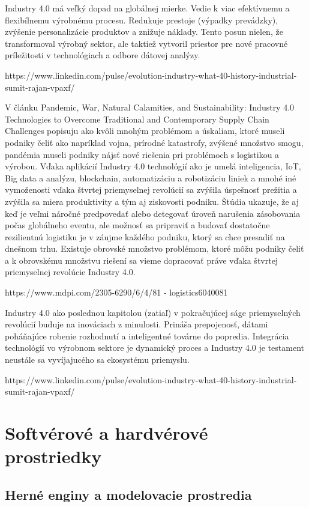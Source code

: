 Industry 4.0 má veľký dopad na globálnej mierke. Vedie k viac efektívnemu a flexibílnemu výrobnému procesu. Redukuje prestoje (výpadky prevádzky), zvýšenie personalizácie produktov a znižuje náklady. Tento posun nielen, že transformoval výrobný sektor, ale taktiež vytvoril priestor pre nové pracovné príležitosti v technológiach a odbore dátovej analýzy.

https://www.linkedin.com/pulse/evolution-industry-what-40-history-industrial-sumit-rajan-vpaxf/

V článku Pandemic, War, Natural Calamities, and Sustainability: Industry 4.0 Technologies to Overcome Traditional and Contemporary Supply Chain Challenges popisuju ako kvôli mnohým problémom a úskaliam, ktoré museli podniky čeliť ako napríklad vojna, prírodné katastrofy, zvýšené množstvo smogu, pandémia museli podniky nájsť nové riešenia pri problémoch s logistikou a výrobou. Vďaka aplikácií Industry 4.0 technológií ako je umelá inteligencia, IoT, Big data a analýzu, blockchain, automatizáciu a robotizáciu liniek a mnohé iné vymoženosti vďaka štvrtej priemyselnej revolúcií sa zvýšila úspešnosť prežitia a zvýšila sa miera produktivity a tým aj ziskovosti podniku. Štúdia ukazuje, že aj keď je veľmi náročné predpovedať alebo detegovať úroveň narušenia zásobovania počas globálneho eventu, ale možnosť sa pripraviť a budovať dostatočne rezilientnú logistiku je v záujme každého podniku, ktorý sa chce presadiť na dnešnom trhu. Existuje obrovské množstvo problémom, ktoré môžu podniky čeliť a k obrovskému množstvu riešení sa vieme dopracovať práve vďaka štvrtej priemyselnej revolúcie Industry 4.0. 

https://www.mdpi.com/2305-6290/6/4/81 - logistics6040081

Industry 4.0 ako poslednou kapitolou (zatiaľ) v pokračujúcej ságe priemyselných revolúcií buduje na inováciach z minulosti. Prináša prepojenosť, dátami poháňajúce robenie rozhodnutí a inteligentné továrne do popredia. Integrácia technológií vo výrobnom sektore je dynamický proces a Industry 4.0 je testament neustále sa vyvíjajucého sa ekosystému priemyslu. 

https://www.linkedin.com/pulse/evolution-industry-what-40-history-industrial-sumit-rajan-vpaxf/

\section{Softvérové a hardvérové prostriedky}

\subsection{Herné enginy a modelovacie prostredia}

